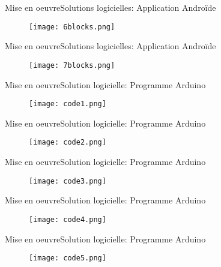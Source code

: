 \documentclass{beamer}
\begin{document}
\begin{frame}{Mise en oeuvre}{Solutions logicielles: Application Androïde}
	\begin{figure}\centering
		\texttt{[image: 6blocks.png]}
	\end{figure}	
\end{frame}

\begin{frame}{Mise en oeuvre}{Solutions logicielles: Application Androïde}
	\begin{figure}\centering
		\texttt{[image: 7blocks.png]}
	\end{figure}	
\end{frame}

\begin{frame}{Mise en oeuvre}{Solution logicielle: Programme Arduino}
	\begin{figure}\centering
		\texttt{[image: code1.png]}
	\end{figure}	
\end{frame}

\begin{frame}{Mise en oeuvre}{Solution logicielle: Programme Arduino}
	\begin{figure}\centering
		\texttt{[image: code2.png]}
	\end{figure}	
\end{frame}

\begin{frame}{Mise en oeuvre}{Solution logicielle: Programme Arduino}
	\begin{figure}\centering
		\texttt{[image: code3.png]}
	\end{figure}	
\end{frame}

\begin{frame}{Mise en oeuvre}{Solution logicielle: Programme Arduino}
	\begin{figure}\centering
		\texttt{[image: code4.png]}
	\end{figure}	
\end{frame}

\begin{frame}{Mise en oeuvre}{Solution logicielle: Programme Arduino}
	\begin{figure}\centering
		\texttt{[image: code5.png]}
	\end{figure}	
\end{frame}
\end{document}
